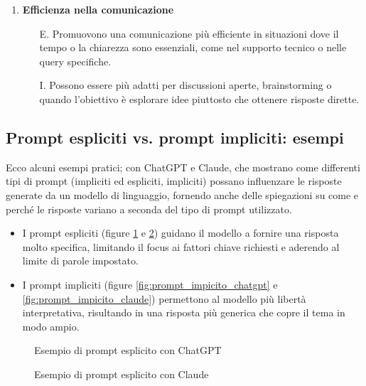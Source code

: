 \begin{enumerate}
                \item \textbf{Efficienza nella comunicazione}
                \begin{itemize}
                    \item[E.] Promuovono una comunicazione più efficiente in situazioni dove il tempo o la chiarezza sono essenziali, come nel supporto tecnico o nelle query specifiche.
                    \item[I.] Possono essere più adatti per discussioni aperte, brainstorming o quando l'obiettivo è esplorare idee piuttosto che ottenere risposte dirette.
                \end{itemize}
            \end{enumerate}

    \subsection{Prompt espliciti vs. prompt impliciti: esempi}
        Ecco alcuni esempi pratici; con ChatGPT e Claude, che mostrano come differenti tipi di prompt (impliciti ed espliciti, impliciti) possano influenzare le risposte generate da un modello di linguaggio, fornendo anche delle spiegazioni su come e perché le risposte variano a seconda del tipo di prompt utilizzato.

        \begin{itemize}
            \item I prompt espliciti (figure \ref{fig:prompt_esplicito_chatgpt} e \ref{fig:prompt_esplicito_claude}) guidano il modello a fornire una risposta molto specifica, limitando il focus ai fattori chiave richiesti e aderendo al limite di parole impostato.
            
            \item I prompt impliciti (figure \ref{fig:prompt_impicito_chatgpt} e \ref{fig:prompt_impicito_claude}) permettono al modello più libertà interpretativa, risultando in una risposta più generica che copre il tema in modo ampio.
        \end{itemize}
        
        \begin{figure}
            \centering
            \missingfigure{}
            \caption{Esempio di prompt esplicito con ChatGPT}
            \label{fig:prompt_esplicito_chatgpt}
        \end{figure}

        \begin{figure}
            \centering
            \missingfigure{}
            \caption{Esempio di prompt esplicito con Claude}
            \label{fig:prompt_esplicito_claude}
        \end{figure}

